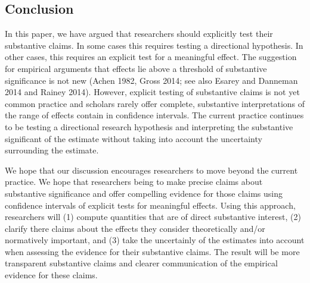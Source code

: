 \documentclass[12pt]{article}
\begin{document}
\subsection*{Conclusion}

In this paper, we have argued that researchers should explicitly test their substantive claims. In some cases this requires testing a directional hypothesis. In other cases, this requires an explicit test for a meaningful effect. The suggestion for empirical arguments that effects lie above a threshold of substantive significance is not new (Achen 1982, Gross 2014; see also Esarey and Danneman 2014 and Rainey 2014). However, explicit testing of substantive claims is not yet common practice and scholars rarely offer complete, substantive interpretations of the range of effects contain in confidence intervals. The current practice continues to be testing a directional research hypothesis and interpreting the substantive significant of the estimate without taking into account the uncertainty surrounding the estimate. 

We hope that our discussion encourages researchers to move beyond the current practice. We hope that researchers being to make precise claims about substantive significance and offer compelling evidence for those claims using confidence intervals of explicit tests for meaningful effects. Using this approach, researchers will (1) compute quantities that are of direct substantive interest, (2) clarify there claims about the effects they consider theoretically and/or normatively important, and (3) take the uncertainly of the estimates into account when assessing the evidence for their substantive claims. The result will be more transparent substantive claims and clearer communication of the empirical evidence for these claims.

%
%
\end{document}
